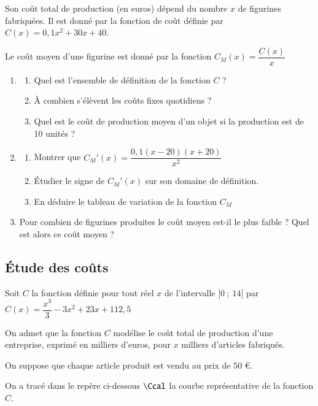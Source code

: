 \documentclass[oneside,12pt]{article}          %
\begin{document}
Son coût total de production (en euros) dépend du nombre $x$ de figurines fabriquées. Il est donné par la fonction de coût définie par $C(x) = 0,1x^2 + 30x + 40$.

Le coût moyen d'une figurine est donné par la fonction $C_M(x) = \dfrac{C(x)}{x}$
\begin{enumerate}
	\item
	\begin{enumerate}
		\item Quel est l'ensemble de définition de la fonction $C$ ?
		\item À combien s'élèvent les coûts fixes quotidiens ?
		\item Quel est le coût de production moyen d'un objet si la production est de 10 unités ?
	\end{enumerate}
	\item
	\begin{enumerate}
		\item Montrer que ${C_M}'(x) = \dfrac{0,1(x - 20)(x + 20)}{x^2}$
		\item Étudier le signe de ${C_M}'(x)$ sur son domaine de définition.
		\item En déduire le tableau de variation de la fonction $C_M$
	\end{enumerate}
	\item Pour combien de figurines produites le coût moyen est-il le plus faible ? Quel est alors ce coût moyen ?
\end{enumerate}



\newpage



\subsection{Étude des coûts}
Soit $C$ la fonction définie pour tout réel $x$ de l'intervalle $]0 ~;~ 14]$ par $C(x) = \dfrac{x^3}{3} - 3x^2 + 23x + 112,5$

On admet que la fonction $C$ modélise le coût total de production d'une entreprise, exprimé en milliers d'euros, pour $x$ milliers d'articles fabriqués.

On suppose que chaque article produit est vendu au prix de $50$ €.

On a tracé dans le repère ci-dessous $\Ccal$ la courbe représentative de la fonction $C$.
\end{document}
